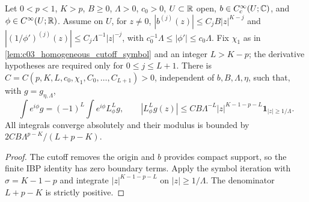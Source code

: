 \begin{lemma}
  \label{lem:c03_homogeneous_far}
  Let $0<p<1$, $K>p$, $B\ge0$, $\Lambda>0$, $c_0>0$, $U\subset\mathbb{R}$ open,
  $b\in C_c^\infty(U;\mathbb{C})$, and $\phi\in C^\infty(U;\mathbb{R})$. Assume on $U$, for $z\ne0$,
  $|b^{(j)}(z)|\le C_jB|z|^{K-j}$ and $|(1/\phi')^{(j)}(z)|\le C_j\Lambda^{-1}|z|^{-j}$,
  with $c_0^{-1}\Lambda\le|\phi'|\le c_0\Lambda$. Fix $\chi_1$
  as in \cref{lem:c03_homogeneous_cutoff_symbol} and an integer $L>K-p$; the derivative hypotheses
  are required only for $0\le j\le L+1$.
  There is $C=C(p,K,L,c_0,\chi_1,C_0,\ldots,C_{L+1})>0$, independent of
  $b,B,\Lambda,\eta$, such that, with $g=g_{\eta,\Lambda}$,
  \[
    \int e^{i\phi}g=(-1)^L\int e^{i\phi}L_\phi^Lg,\qquad
    |L_\phi^Lg(z)|\le CB\Lambda^{-L}|z|^{K-1-p-L}
       \mathbf1_{|z|\ge1/\Lambda}.
  \]
  All integrals converge absolutely and their modulus is bounded by
  $2CB\Lambda^{p-K}/(L+p-K)$.
\end{lemma}
\begin{proof}
  The cutoff removes the origin and $b$ provides compact support, so the finite IBP identity
  has zero boundary terms. Apply the symbol iteration with $\sigma=K-1-p$ and integrate
  $|z|^{K-1-p-L}$ on $|z|\ge1/\Lambda$. The denominator $L+p-K$ is strictly positive.
\end{proof}

